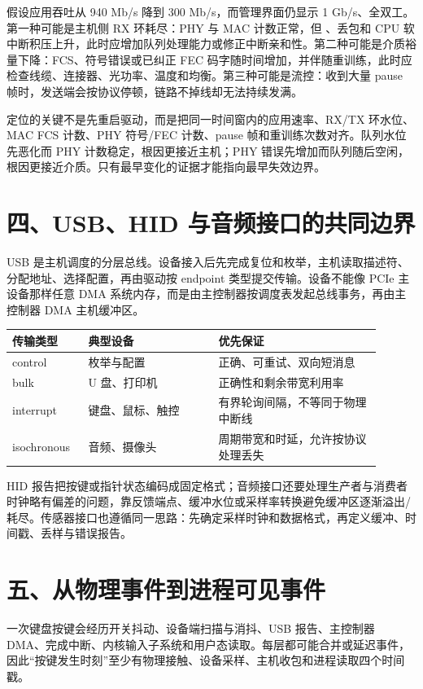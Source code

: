 
假设应用吞吐从 940 Mb/s 降到 300 Mb/s，而管理界面仍显示 1 Gb/s、全双工。第一种可能是主机侧 RX 环耗尽：PHY 与 MAC 计数正常，但 、丢包和 CPU 软中断积压上升，此时应增加队列处理能力或修正中断亲和性。第二种可能是介质裕量下降：FCS、符号错误或已纠正 FEC 码字随时间增加，并伴随重训练，此时应检查线缆、连接器、光功率、温度和均衡。第三种可能是流控：收到大量 pause 帧时，发送端会按协议停顿，链路不掉线却无法持续发满。

定位的关键不是先重启驱动，而是把同一时间窗内的应用速率、RX/TX 环水位、MAC FCS 计数、PHY 符号/FEC 计数、pause 帧和重训练次数对齐。队列水位先恶化而 PHY 计数稳定，根因更接近主机；PHY 错误先增加而队列随后空闲，根因更接近介质。只有最早变化的证据才能指向最早失效边界。
\section{四、USB、HID 与音频接口的共同边界}

USB 是主机调度的分层总线。设备接入后先完成复位和枚举，主机读取描述符、分配地址、选择配置，再由驱动按 endpoint 类型提交传输。设备不能像 PCIe 主设备那样任意 DMA 系统内存，而是由主控制器按调度表发起总线事务，再由主控制器 DMA 主机缓冲区。

\begin{longtable}{L{0.18\linewidth}L{0.32\linewidth}L{0.4\linewidth}}
\toprule
传输类型 & 典型设备 & 优先保证 \\
\midrule
control & 枚举与配置 & 正确、可重试、双向短消息 \\\tablerowrule
bulk & U 盘、打印机 & 正确性和剩余带宽利用率 \\\tablerowrule
interrupt & 键盘、鼠标、触控 & 有界轮询间隔，不等同于物理中断线 \\\tablerowrule
isochronous & 音频、摄像头 & 周期带宽和时延，允许按协议处理丢失 \\
\bottomrule
\end{longtable}

HID 报告把按键或指针状态编码成固定格式；音频接口还要处理生产者与消费者时钟略有偏差的问题，靠反馈端点、缓冲水位或采样率转换避免缓冲区逐渐溢出/耗尽。传感器接口也遵循同一思路：先确定采样时钟和数据格式，再定义缓冲、时间戳、丢样与错误报告。

\section{五、从物理事件到进程可见事件}

一次键盘按键会经历开关抖动、设备端扫描与消抖、USB 报告、主控制器 DMA、完成中断、内核输入子系统和用户态读取。每层都可能合并或延迟事件，因此“按键发生时刻”至少有物理接触、设备采样、主机收包和进程读取四个时间戳。

